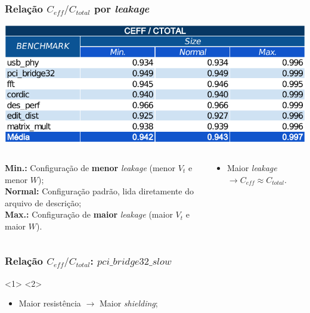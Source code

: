 \documentclass[10pt,a4paper]{beamer}
\begin{document}
		
		\begin{frame}[t]
			\frametitle{Relação $C_{eff} / C_{total}$ por \textit{leakage}}
			\begin{center}
				\includegraphics[width=\linewidth]{img/ceff_ratio/ceff_ctotal_todos.pdf}
				\begin{columns}
					\begin{column}{0.4 \textwidth}
						\begin{shaded}
							\scriptsize{\textbf{Min.:} Configuração de \textbf{menor} \textit{leakage} (menor $V_t$ e menor $W$);} \\
							\scriptsize{\textbf{Normal:} Configuração padrão, lida diretamente do arquivo de descrição;}\\
							\scriptsize{\textbf{Max.:} Configuração de \textbf{maior} \textit{leakage} (maior $V_t$ e maior $W$).}
						\end{shaded}
					\end{column}
					\begin{column}{0.6 \textwidth}
						\begin{itemize}
							\item Maior \textit{leakage} $\to C_{eff} \approx C_{total}$.
						\end{itemize}
					\end{column}
				\end{columns}						
			\end{center}
			
		\end{frame}
		
		\begin{frame}
			\frametitle{Relação $C_{eff} / C_{total}$: $pci\_bridge32\_slow$}
			\begin{center}
				<1>
				<2>
			\end{center}
			
			{
				\begin{itemize}
					\item Maior resistência $\to$ Maior \textit{shielding};
				\end{itemize}
			}
		\end{frame}
		
\end{document}
